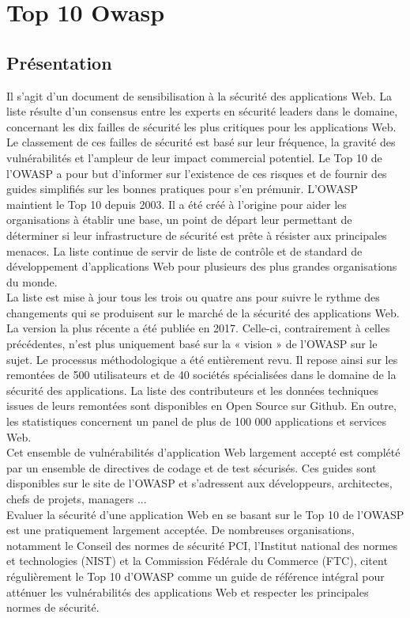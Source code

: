 \section{Top 10 Owasp}
\subsection{Présentation}
Il s’agit d’un document de sensibilisation à la sécurité des applications Web. La liste résulte d’un consensus entre les experts en sécurité leaders dans le domaine, concernant les dix failles de sécurité les plus critiques pour les applications Web. Le classement de ces failles de sécurité est basé sur leur fréquence, la gravité des vulnérabilités et l'ampleur de leur impact commercial potentiel. Le Top 10 de l’OWASP a pour but d’informer sur l’existence de ces risques et de fournir des guides simplifiés sur les bonnes pratiques pour s’en prémunir. L’OWASP maintient le Top 10 depuis 2003. Il a été créé à l'origine pour aider les organisations à établir une base, un point de départ leur permettant de déterminer si leur infrastructure de sécurité est prête à résister aux principales menaces. La liste continue de servir de liste de contrôle et de standard de développement d'applications Web pour plusieurs des plus grandes organisations du monde. \\
La liste est mise à jour tous les trois ou quatre ans pour suivre le rythme des changements qui se produisent sur le marché de la sécurité des applications Web. La version la plus récente a été publiée en 2017. Celle-ci, contrairement à celles précédentes, n’est plus uniquement basé sur la « vision » de l’OWASP sur le sujet. Le processus méthodologique a été entièrement revu. Il repose ainsi sur les remontées de 500 utilisateurs et de 40 sociétés spécialisées dans le domaine de la sécurité des applications. La liste des contributeurs et les données techniques issues de leurs remontées sont disponibles en Open Source sur Github. En outre, les statistiques concernent un panel de plus de 100 000 applications et services Web.\\
Cet ensemble de vulnérabilités d'application Web largement accepté est complété par un ensemble de directives de codage et de test sécurisés. Ces guides sont disponibles sur le site de l'OWASP et s'adressent aux développeurs, architectes, chefs de projets, managers ... \\
Evaluer la sécurité d’une application Web en se basant sur le Top 10 de l’OWASP est une pratiquement largement acceptée. De nombreuses organisations, notamment le Conseil des normes de sécurité PCI, l'Institut national des normes et technologies (NIST) et la Commission Fédérale du Commerce (FTC), citent régulièrement le Top 10 d'OWASP comme un guide de référence intégral pour atténuer les vulnérabilités des applications Web et respecter les principales normes de sécurité. 

